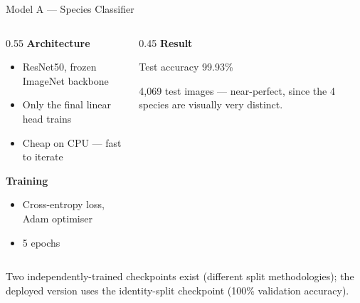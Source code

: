 \documentclass{beamer}
\begin{document}
\begin{frame}{Model A --- Species Classifier}
  \begin{columns}
    \begin{column}{0.55\textwidth}
      \textbf{Architecture}
      \begin{itemize}
        \item ResNet50, frozen ImageNet backbone
        \item Only the final linear head trains
        \item Cheap on CPU --- fast to iterate
      \end{itemize}

      \vspace{0.5em}
      \textbf{Training}
      \begin{itemize}
        \item Cross-entropy loss, Adam optimiser
        \item 5 epochs
      \end{itemize}
    \end{column}
    \begin{column}{0.45\textwidth}
      \textbf{Result}
      \begin{block}{Test accuracy}
        \centering \Large 99.93\%
      \end{block}
      \small 4{,}069 test images --- near-perfect, since the 4 species are
      visually very distinct.
    \end{column}
  \end{columns}

  \vspace{1em}
  Two independently-trained checkpoints exist (different split
  methodologies); the deployed version uses the identity-split checkpoint
  (100\% validation accuracy).
\end{frame}
\end{document}

